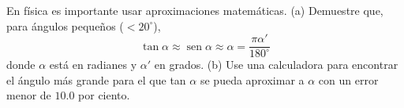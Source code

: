 \item En física es importante usar aproximaciones matemáticas. (a) Demuestre que, para ángulos pequeños ($< 20^\circ$),
$$ \tan \alpha \approx \operatorname{sen} \alpha \approx \alpha = \frac{\pi \alpha'}{180^\circ} $$
donde $\alpha$ está en radianes y $\alpha'$ en grados. (b) Use una calculadora para encontrar el ángulo más grande para el que tan $\alpha$ se pueda aproximar a $\alpha$ con un error menor de $10.0$ por ciento.
